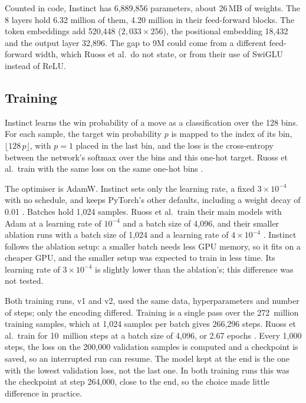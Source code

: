 Counted in code, Instinct has 6,889,856 parameters, about 26\,MB of weights.
The 8 layers hold 6.32 million of them, 4.20 million in their feed-forward blocks.
The token embeddings add 520,448 ($2{,}033 \times 256$), the positional embedding 18,432 and the output layer 32,896.
The gap to 9M could come from a different feed-forward width, which Ruoss et al.\ do not state, or from their use of SwiGLU instead of \ac{ReLU}.

\subsection{Training}
\label{subsec:training}

Instinct learns the win probability of a move as a classification over the 128 bins.
For each sample, the target win probability $p$ is mapped to the index of its bin, $\lfloor 128\,p \rfloor$, with $p = 1$ placed in the last bin, and the loss is the cross-entropy between the network's softmax over the bins and this one-hot target.
Ruoss et al.\ train with the same loss on the same one-hot bins \cite{Ruoss2024}.

The optimiser is AdamW.
Instinct sets only the learning rate, a fixed $3 \times 10^{-4}$ with no schedule, and keeps PyTorch's other defaults, including a weight decay of 0.01 \cite{pytorch}.
Batches hold 1,024 samples.
Ruoss et al.\ train their main models with Adam at a learning rate of $10^{-4}$ and a batch size of 4,096, and their smaller ablation runs with a batch size of 1,024 and a learning rate of $4 \times 10^{-4}$ \cite{Ruoss2024}.
Instinct follows the ablation setup: a smaller batch needs less \ac{GPU} memory, so it fits on a cheaper \ac{GPU}, and the smaller setup was expected to train in less time.
Its learning rate of $3 \times 10^{-4}$ is slightly lower than the ablation's; this difference was not tested.

Both training runs, v1 and v2, used the same data, hyperparameters and number of steps; only the encoding differed.
Training is a single pass over the 272~million training samples, which at 1,024 samples per batch gives 266,296 steps.
Ruoss et al.\ train for 10~million steps at a batch size of 4,096, or 2.67 epochs \cite{Ruoss2024}.
Every 1,000 steps, the loss on the 200,000 validation samples is computed and a checkpoint is saved, so an interrupted run can resume.
The model kept at the end is the one with the lowest validation loss, not the last one.
In both training runs this was the checkpoint at step 264,000, close to the end, so the choice made little difference in practice.

